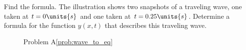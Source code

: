 \begin{aproblem}{Find the formula.}
  The illustration shows two snapshots of a traveling wave, one taken
  at $t=0\units{s}$ and one taken at $t = 0.25\units{s}$.  Determine a
  formula for the function $y(x,t)$ that describes this traveling
  wave.
  \label{prob:wave_to_eq}
  \begin{figure}[h]
    \begin{center}
      \caption{Problem A\ref{prob:wave_to_eq}}
    \end{center}
  \end{figure}
\end{aproblem}

\newpage

